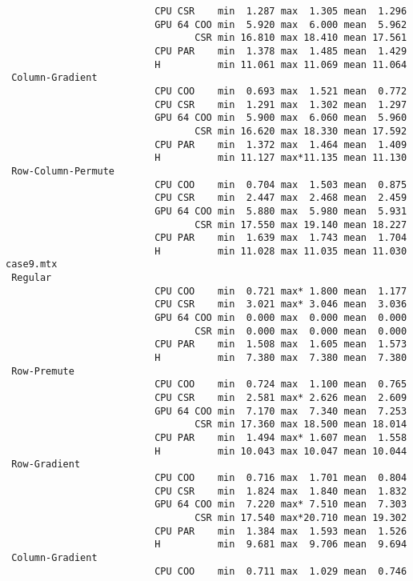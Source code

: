 \begin{verbatim}
                          CPU CSR    min  1.287 max  1.305 mean  1.296
                          GPU 64 COO min  5.920 max  6.000 mean  5.962
                                 CSR min 16.810 max 18.410 mean 17.561
                          CPU PAR    min  1.378 max  1.485 mean  1.429
                          H          min 11.061 max 11.069 mean 11.064
 Column-Gradient
                          CPU COO    min  0.693 max  1.521 mean  0.772
                          CPU CSR    min  1.291 max  1.302 mean  1.297
                          GPU 64 COO min  5.900 max  6.060 mean  5.960
                                 CSR min 16.620 max 18.330 mean 17.592
                          CPU PAR    min  1.372 max  1.464 mean  1.409
                          H          min 11.127 max*11.135 mean 11.130
 Row-Column-Permute
                          CPU COO    min  0.704 max  1.503 mean  0.875
                          CPU CSR    min  2.447 max  2.468 mean  2.459
                          GPU 64 COO min  5.880 max  5.980 mean  5.931
                                 CSR min 17.550 max 19.140 mean 18.227
                          CPU PAR    min  1.639 max  1.743 mean  1.704
                          H          min 11.028 max 11.035 mean 11.030
case9.mtx
 Regular
                          CPU COO    min  0.721 max* 1.800 mean  1.177
                          CPU CSR    min  3.021 max* 3.046 mean  3.036
                          GPU 64 COO min  0.000 max  0.000 mean  0.000
                                 CSR min  0.000 max  0.000 mean  0.000
                          CPU PAR    min  1.508 max  1.605 mean  1.573
                          H          min  7.380 max  7.380 mean  7.380
 Row-Premute
                          CPU COO    min  0.724 max  1.100 mean  0.765
                          CPU CSR    min  2.581 max* 2.626 mean  2.609
                          GPU 64 COO min  7.170 max  7.340 mean  7.253
                                 CSR min 17.360 max 18.500 mean 18.014
                          CPU PAR    min  1.494 max* 1.607 mean  1.558
                          H          min 10.043 max 10.047 mean 10.044
 Row-Gradient
                          CPU COO    min  0.716 max  1.701 mean  0.804
                          CPU CSR    min  1.824 max  1.840 mean  1.832
                          GPU 64 COO min  7.220 max* 7.510 mean  7.303
                                 CSR min 17.540 max*20.710 mean 19.302
                          CPU PAR    min  1.384 max  1.593 mean  1.526
                          H          min  9.681 max  9.706 mean  9.694
 Column-Gradient
                          CPU COO    min  0.711 max  1.029 mean  0.746

\end{verbatim}
